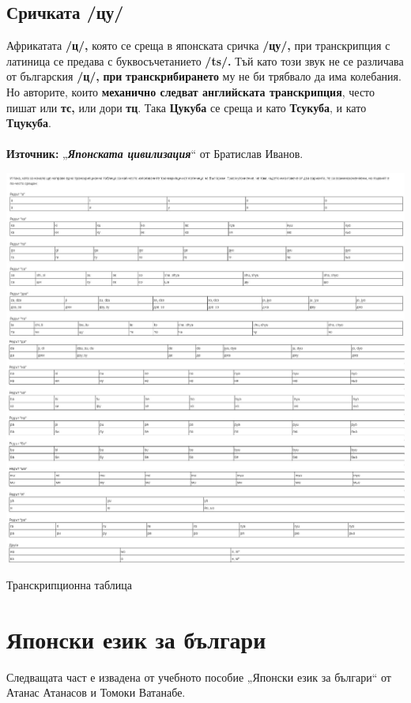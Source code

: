 \subsection{Сричката /цу/}
Африкатата \textbf{/ц/,} която се среща в японската сричка \textbf{/цу/,} при транскрипция с латиница се предава с буквосъчетанието \textbf{/ts/.} Тъй като този звук не се различава от българския \textbf{/ц/,} \textbf{при} \textbf{транскрибирането} му не би трябвало да има колебания.
Но авторите, които \textbf{механично следват английската транскрипция}, често пишат или\textbf{ тс, }или\textbf{ }дори\textbf{ тц}. Така \textbf{Цукуба} се среща и като \textbf{Тсукуба}, и като \textbf{Тцукуба}. \\\\

\textbf{Източник:} „\textbf{\textit{Японската цивилизация}}“ от Братислав Иванов.
 
\begin{table}[htbp]
    \centering
    \includegraphics[width=\textwidth]{chapters/transcription-1.JPG}
    \includegraphics[width=\textwidth]{chapters/transcription-2.JPG}
    \caption{Транскрипционна таблица}
\end{table}

\clearpage

\section{Японски език за българи}
Следващата част е извадена от учебното пособие „Японски език за българи“ от Атанас Атанасов и Томоки Ватанабе.

 
  
